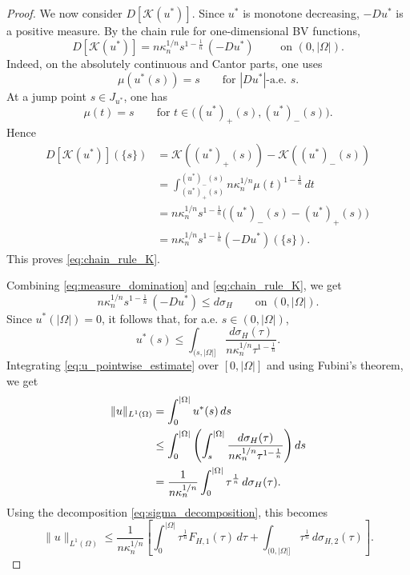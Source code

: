 \documentclass[10pt,a4paper]{amsart}
\begin{document}
\begin{proof}
We now consider \(D[\mathcal K(u^*)]\). Since \(u^*\) is monotone decreasing,
\(-Du^*\) is a positive measure. By the chain rule for one-dimensional BV
functions,
\begin{equation}\label{eq:chain_rule_K}
D[\mathcal K(u^*)]
=
n\kappa_n^{1/n}s^{1-\frac1n}\,(-Du^*)
\qquad\text{ on }(0,|\Omega|).
\end{equation}
 Indeed, on the
absolutely continuous and Cantor parts, one uses
\[
\mu(u^*(s))=s
\qquad\text{for }|Du^*|\text{-a.e. }s.
\]
At a jump point \(s\in J_{u^*}\), one has
\[
\mu(t)=s
\qquad
\text{for }t\in\big((u^*)_+(s),(u^*)_-(s)\big).
\]
Hence
\begin{align*}
D[\mathcal K(u^*)](\{s\})
&=
\mathcal K((u^*)_+(s))-\mathcal K((u^*)_-(s))\\
&=
\int_{(u^*)_+(s)}^{(u^*)_-(s)}
n\kappa_n^{1/n}\mu(t)^{1-\frac1n}\,dt\\
&=
n\kappa_n^{1/n}s^{1-\frac1n}
\big((u^*)_-(s)-(u^*)_+(s)\big)\\
&=
n\kappa_n^{1/n}s^{1-\frac1n}(-Du^*)(\{s\}).
\end{align*}
This proves \eqref{eq:chain_rule_K}.

Combining \eqref{eq:measure_domination} and \eqref{eq:chain_rule_K}, we get
\[
n\kappa_n^{1/n}s^{1-\frac1n}\,(-Du^*)
\le
d\sigma_H
\qquad\text{on }(0,|\Omega|).
\]
Since \(u^*(|\Omega|)=0\), it follows that, for a.e. \(s\in(0,|\Omega|)\),
\begin{equation}\label{eq:u_pointwise_estimate}
u^*(s)
\le
\int_{(s,|\Omega|]}
\frac{d\sigma_H(\tau)}
{n\kappa_n^{1/n}\tau^{1-\frac1n}}.
\end{equation}
Integrating \eqref{eq:u_pointwise_estimate} over $[0,|\Omega|]$ and using Fubini's
theorem, we get
\begin{align}
\|u\|_{L^1(\Omega)}
&=
\int_0^{|\Omega|} u^*(s)\,ds \notag\\
&\le
\int_0^{|\Omega|}
\left(
\int_s^{|\Omega|}
\frac{d\sigma_H(\tau)}{n\kappa_n^{1/n}\tau^{1-\frac1n}}
\right)ds \notag\\
&=
\frac1{n\kappa_n^{1/n}}
\int_0^{|\Omega|}\tau^{\frac1n}\,d\sigma_H(\tau). \label{eq:L1_after_fubini}
\end{align}
Using the decomposition \eqref{eq:sigma_decomposition}, this becomes
\begin{equation}\label{eq:L1_split}
\|u\|_{L^1(\Omega)}
\le
\frac1{n\kappa_n^{1/n}}
\left[
\int_0^{|\Omega|}\tau^{\frac1n}F_{H,1}(\tau)\,d\tau
+
\int_{(0,|\Omega|]}\tau^{\frac1n}\,d\sigma_{H,2}(\tau)
\right].
\end{equation}


\end{proof}
\end{document}
